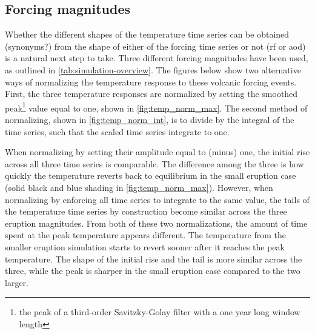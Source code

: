 \documentclass{ametsocV5}
\begin{document}
\subsection{Forcing magnitudes}

Whether the different shapes of the temperature time series can be obtained (synonyms?)
from the shape of either of the forcing time series or not (\ac{rf} or \ac{aod}) is a
natural next step to take. Three different forcing magnitudes have been used, as
outlined in \cref{tab:simulation-overview}. The figures below show two alternative ways
of normalizing the temperature response to these volcanic forcing events. First, the
three temperature responses are normalized by setting the smoothed peak\footnote{the
  peak of a third-order Savitzky-Golay filter with a one year long window length} value
equal to one, shown in \cref{fig:temp_norm_max}. The second method of normalizing, shown
in \cref{fig:temp_norm_int}, is to divide by the integral of the time series, such that
the scaled time series integrate to one.

When normalizing by setting their amplitude equal to (minus) one, the initial rise
across all three time series is comparable. The difference among the three is how
quickly the temperature reverts back to equilibrium in the small eruption case (solid
black and blue shading in \cref{fig:temp_norm_max}). However, when normalizing by
enforcing all time series to integrate to the same value, the tails of the temperature
time series by construction become similar across the three eruption magnitudes. From
both of these two normalizations, the amount of time spent at the peak temperature
appears different. The temperature from the smaller eruption simulation starts to revert
sooner after it reaches the peak temperature. The shape of the initial rise and the tail
is more similar across the three, while the peak is sharper in the small eruption case
compared to the two larger.

\end{document}
